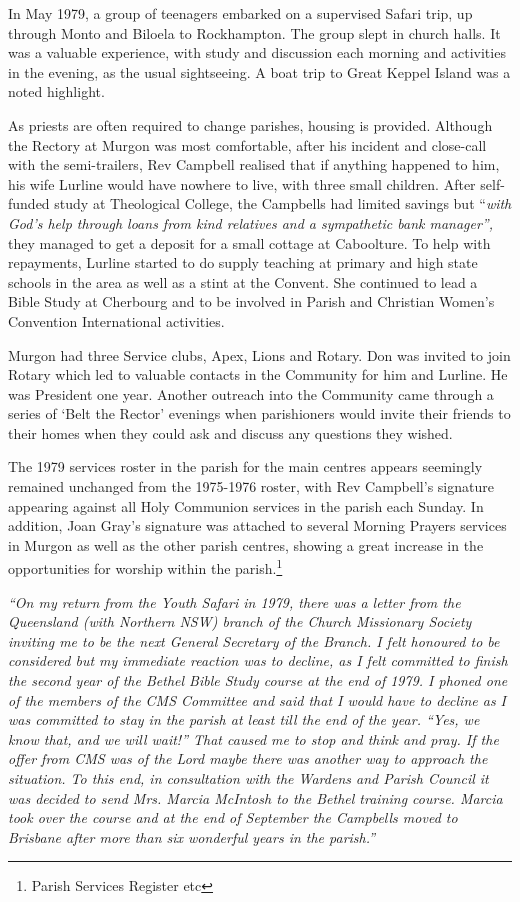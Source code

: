 In May 1979, a group of teenagers embarked on a supervised Safari trip, up through Monto and Biloela to Rockhampton. The group slept in church halls. It was a valuable experience, with study and discussion each morning and activities in the evening, as the usual sightseeing. A boat trip to Great Keppel Island was a noted highlight.

As priests are often required to change parishes, housing is provided. Although the Rectory at Murgon was most comfortable, after his incident and close-call with the semi-trailers, Rev Campbell realised that if anything happened to him, his wife Lurline would have nowhere to live, with three small children. After self-funded study at Theological College, the Campbells had limited savings but ``\emph{with God's help through loans from kind relatives and a sympathetic bank manager'',} they managed to get a deposit for a small cottage at Caboolture. To help with repayments, Lurline started to do supply teaching at primary and high state schools in the area as well as a stint at the Convent. She continued to lead a Bible Study at Cherbourg and to be involved in Parish and Christian Women's Convention International activities.

Murgon had three Service clubs, Apex, Lions and Rotary. Don was invited to join Rotary which led to valuable contacts in the Community for him and Lurline. He was President one year. Another outreach into the Community came through a series of `Belt the Rector' evenings when parishioners would invite their friends to their homes when they could ask and discuss any questions they wished.

The 1979 services roster in the parish for the main centres appears seemingly remained unchanged from the 1975-1976 roster, with Rev Campbell's signature appearing against all Holy Communion services in the parish each Sunday. In addition, Joan Gray's signature was attached to several Morning Prayers services in Murgon as well as the other parish centres, showing a great increase in the opportunities for worship within the parish.\footnote{Parish Services Register etc}

\emph{``On my return from the Youth Safari in 1979, there was a letter from the Queensland (with Northern NSW) branch of the Church Missionary Society inviting me to be the next General Secretary of the Branch. I felt honoured to be considered but my immediate reaction was to decline, as I felt committed to finish the second year of the Bethel Bible Study course at the end of 1979. I phoned one of the members of the CMS Committee and said that I would have to decline as I was committed to stay in the parish at least till the end of the year. ``Yes, we know that, and we will wait!'' That caused me to stop and think and pray. If the offer from CMS was of the Lord maybe there was another way to approach the situation. To this end, in consultation with the Wardens and Parish Council it was decided to send Mrs. Marcia McIntosh to the Bethel training course. Marcia took over the course and at the end of September the Campbells moved to Brisbane after more than six wonderful years in the parish.''}

